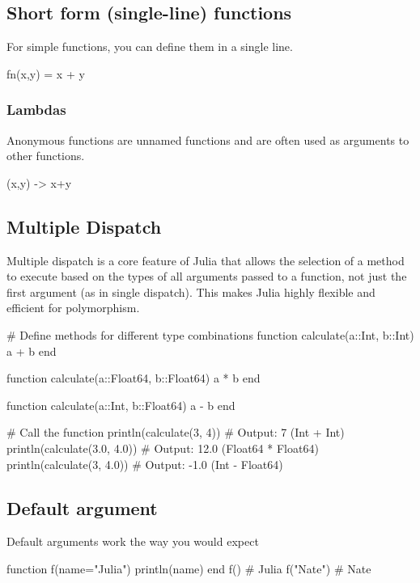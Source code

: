 \documentclass{report}
\begin{document}
    \subsection{Short form (single-line) functions}
    \bigbreak \noindent 
    For simple functions, you can define them in a single line.
    \bigbreak \noindent 
    \begin{jlcode}
    fn(x,y) = x + y 
    \end{jlcode}
    \bigbreak \noindent 
    \subsubsection{Lambdas}
    \bigbreak \noindent 
    Anonymous functions are unnamed functions and are often used as arguments to other functions.
    \bigbreak \noindent 
    \begin{jlcode}
        (x,y) -> x+y
    \end{jlcode}

    \bigbreak \noindent 
    \subsection{Multiple Dispatch}
    \bigbreak \noindent 
    Multiple dispatch is a core feature of Julia that allows the selection of a method to execute based on the types of all arguments passed to a function, not just the first argument (as in single dispatch). This makes Julia highly flexible and efficient for polymorphism.
    \bigbreak \noindent 
    \begin{jlcode}
    # Define methods for different type combinations
    function calculate(a::Int, b::Int)
        a + b
    end

    function calculate(a::Float64, b::Float64)
        a * b
    end

    function calculate(a::Int, b::Float64)
        a - b
    end

    # Call the function
    println(calculate(3, 4))       # Output: 7 (Int + Int)
    println(calculate(3.0, 4.0))   # Output: 12.0 (Float64 * Float64)
    println(calculate(3, 4.0))     # Output: -1.0 (Int - Float64)
    \end{jlcode}

    \bigbreak \noindent 
    \subsection{Default argument}
    \bigbreak \noindent 
    Default  arguments work the way you would expect
    \bigbreak \noindent 
    \begin{jlcode}
    function f(name="Julia")
        println(name)
    end
    f() # Julia
    f("Nate") # Nate
    \end{jlcode}
\end{document}
